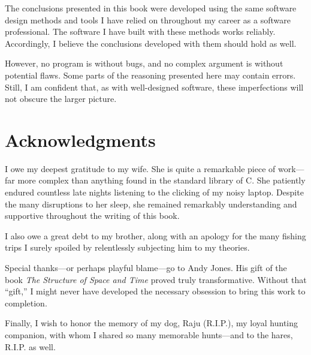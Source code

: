 The conclusions presented in this book were developed using the same software design methods and tools I have relied on throughout my career as a software professional.
The software I have built with these methods works reliably. Accordingly, I believe the conclusions developed with them should hold as well.

However, no program is without bugs, and no complex argument is without potential flaws. Some parts of the reasoning presented here may contain errors. Still, I am confident that, as with well-designed software, these imperfections will not obscure the larger picture.

\section*{Acknowledgments}

I owe my deepest gratitude to my wife.
She is quite a remarkable piece of work---far more complex than anything found in the standard library of C.
She patiently endured countless late nights listening to the clicking of my noisy laptop.
Despite the many disruptions to her sleep, she remained remarkably understanding and supportive throughout the writing of this book.

I also owe a great debt to my brother, along with an apology for the many fishing trips I surely spoiled by relentlessly subjecting him to my theories.

Special thanks---or perhaps playful blame---go to Andy Jones.
His gift of the book \emph{The Structure of Space and Time} proved truly transformative.
Without that ``gift,'' I might never have developed the necessary obsession to bring this work to completion.

Finally, I wish to honor the memory of my dog, Raju (R.I.P.), my loyal hunting companion, with whom I shared so many memorable hunts---and to the hares, R.I.P. as well.
